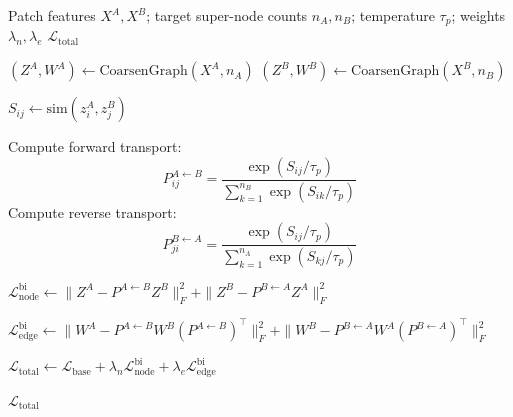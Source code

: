 \begin{algorithm}[t]
\caption{Variable-Cardinality Bidirectional Super-Node Alignment}
\label{alg:bidirectional_supernode_alignment}
\begin{algorithmic}[1]
\Require
Patch features \(X^A, X^B\);
target super-node counts \(n_A, n_B\);
temperature \(\tau_p\);
weights \(\lambda_n,\lambda_e\)
\Ensure
\(\mathcal{L}_{\mathrm{total}}\)

\State \((Z^A, W^A) \gets \mathrm{CoarsenGraph}(X^A, n_A)\)
\State \((Z^B, W^B) \gets \mathrm{CoarsenGraph}(X^B, n_B)\)

        \State \(S_{ij} \gets \mathrm{sim}(z_i^A, z_j^B)\)
    \EndFor
\EndFor

\State Compute forward transport:
\[
P^{A\leftarrow B}_{ij}
=
\frac{\exp(S_{ij}/\tau_p)}
{\sum_{k=1}^{n_B}\exp(S_{ik}/\tau_p)}
\]
\State Compute reverse transport:
\[
P^{B\leftarrow A}_{ji}
=
\frac{\exp(S_{ij}/\tau_p)}
{\sum_{k=1}^{n_A}\exp(S_{kj}/\tau_p)}
\]

\State
\(
\mathcal{L}_{\mathrm{node}}^{\mathrm{bi}}
\gets
\| Z^A - P^{A\leftarrow B} Z^B \|_F^2
+
\| Z^B - P^{B\leftarrow A} Z^A \|_F^2
\)

\State
\(
\mathcal{L}_{\mathrm{edge}}^{\mathrm{bi}}
\gets
\| W^A - P^{A\leftarrow B} W^B (P^{A\leftarrow B})^\top \|_F^2
+
\| W^B - P^{B\leftarrow A} W^A (P^{B\leftarrow A})^\top \|_F^2
\)

\State
\(
\mathcal{L}_{\mathrm{total}}
\gets
\mathcal{L}_{\mathrm{base}}
+
\lambda_n \mathcal{L}_{\mathrm{node}}^{\mathrm{bi}}
+
\lambda_e \mathcal{L}_{\mathrm{edge}}^{\mathrm{bi}}
\)

\State \Return \(\mathcal{L}_{\mathrm{total}}\)
\end{algorithmic}
\end{algorithm}